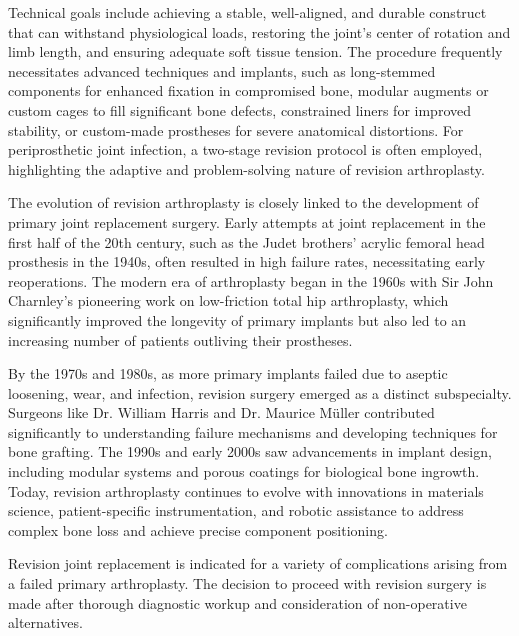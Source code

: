 Technical goals include achieving a stable, well-aligned, and durable construct that can withstand physiological loads, restoring the joint's center of rotation and limb length, and ensuring adequate soft tissue tension. The procedure frequently necessitates advanced techniques and implants, such as long-stemmed components for enhanced fixation in compromised bone, modular augments or custom cages to fill significant bone defects, constrained liners for improved stability, or custom-made prostheses for severe anatomical distortions. For periprosthetic joint infection, a two-stage revision protocol is often employed, highlighting the adaptive and problem-solving nature of revision arthroplasty.

The evolution of revision arthroplasty is closely linked to the development of primary joint replacement surgery. Early attempts at joint replacement in the first half of the 20th century, such as the Judet brothers' acrylic femoral head prosthesis in the 1940s, often resulted in high failure rates, necessitating early reoperations. The modern era of arthroplasty began in the 1960s with Sir John Charnley's pioneering work on low-friction total hip arthroplasty, which significantly improved the longevity of primary implants but also led to an increasing number of patients outliving their prostheses.

By the 1970s and 1980s, as more primary implants failed due to aseptic loosening, wear, and infection, revision surgery emerged as a distinct subspecialty. Surgeons like Dr. William Harris and Dr. Maurice M\"uller contributed significantly to understanding failure mechanisms and developing techniques for bone grafting. The 1990s and early 2000s saw advancements in implant design, including modular systems and porous coatings for biological bone ingrowth. Today, revision arthroplasty continues to evolve with innovations in materials science, patient-specific instrumentation, and robotic assistance to address complex bone loss and achieve precise component positioning.

Revision joint replacement is indicated for a variety of complications arising from a failed primary arthroplasty. The decision to proceed with revision surgery is made after thorough diagnostic workup and consideration of non-operative alternatives.

